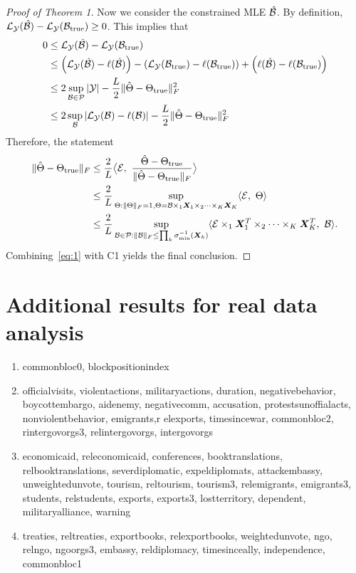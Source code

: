 \documentclass[11pt]{article}
\theoremstyle{plain}
\theoremstyle{definition}
\begin{document}
\begin{proof}[Proof of Theorem 1]
Now we consider the constrained MLE $\hat {\mathcal{B}}$. By definition, $\mathcal{L}_{\mathcal{Y}}(\hat {\mathcal{B}})- \mathcal{L}_{\mathcal{Y}}(\mathcal{B}_{\text{true}})\geq 0$. This implies that
\begin{align}
0&\leq \mathcal{L}_{\mathcal{Y}}(\hat {\mathcal{B}})- \mathcal{L}_{\mathcal{Y}}(\mathcal{B}_{\text{true}}) \\
&\leq \left(\mathcal{L}_{\mathcal{Y}}(\hat {\mathcal{B}})-\ell(\hat {\mathcal{B}})\right)-\left( \mathcal{L}_{\mathcal{Y}}(\mathcal{B}_{\text{true}})-\ell(\mathcal{B}_{\text{true}})\right)+\left(\ell(\hat {\mathcal{B}})-\ell(\mathcal{B}_{\text{true}})\right)\\
&\leq 2\sup_{\mathcal{B}\in\mathcal{P}}|\mathcal{Y}| -{L\over 2}\lVert\hat \Theta-\Theta_{\text{true}}\rVert_F^2\\
&\leq 2\sup_{\mathcal{B}}|\mathcal{L}_{\mathcal{Y}}(\mathcal{B})-\ell(\mathcal{B})|-{L\over 2}\lVert\hat \Theta-\Theta_{\text{true}}\rVert_F^2
\end{align}
Therefore, the statement
\begin{align}\label{eq:1}
\FnormSize{}{\hat \Theta-\trueT}&\leq {2\over L}\big\langle \tE,\ {\hat \Theta -\trueT \over \FnormSize{}{\hat \Theta-\trueT}} \big\rangle\\
&\leq {2\over L}\sup_{\Theta: \FnormSize{}{\Theta}=1, \Theta=\tB\times_1\mX_1\times_2\cdots\times_K \mX_K}\langle \tE,\ \Theta \rangle\\
&\leq {2\over L}\sup_{\tB\in\tP: \FnormSize{}{\tB}\leq \prod_k \sigma^{-1}_{\min}(\mX_k)} \langle \tE\times_1\mX^T_1\times_2\cdots\times_K \mX^T_K,\ \tB\rangle.
\end{align}
Combining~\eqref{eq:1} with C1 yields the final conclusion. 

\end{proof}

\section{Additional results for real data analysis}
\begin{enumerate}
\item  commonbloc0, blockpositionindex
\item officialvisits, violentactions, militaryactions, duration, negativebehavior, boycottembargo, aidenemy, negativecomm, accusation, protestsunoffialacts,    nonviolentbehavior, emigrants,r elexports,    timesincewar, commonbloc2, rintergovorgs3, relintergovorgs, intergovorgs
\item economicaid, releconomicaid, conferences, booktranslations, relbooktranslations, severdiplomatic, expeldiplomats, attackembassy, unweightedunvote, tourism, reltourism, tourism3, relemigrants, emigrants3, students, relstudents, exports, exports3, lostterritory, dependent, militaryalliance, warning  
\item treaties, reltreaties, exportbooks, relexportbooks, weightedunvote, ngo, relngo, ngoorgs3, embassy, reldiplomacy, timesinceally, independence, commonbloc1
\end{enumerate}
\end{document}
